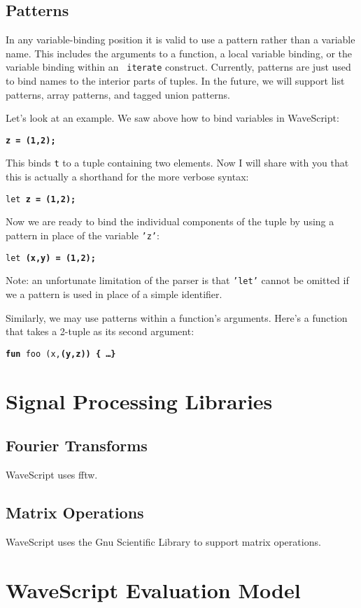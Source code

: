 \section{Patterns}

In any variable-binding position it is valid to use a pattern rather
than a variable name.  This includes the arguments to a function, a
local variable binding, or the variable binding within an {\tt
  iterate} construct.  Currently, patterns are just used to bind names
to the interior parts of tuples.  In the future, we will support list
patterns, array patterns, and tagged union patterns.  

Let's look at an example.
We saw above how to bind variables in WaveScript:
\begin{center}
{\tt \bf{z} = (1,2);}
\end{center}
This binds {\tt t} to a tuple containing two elements.  
Now I will share with you that this is actually a shorthand for the
more verbose syntax:
\begin{center}
{\tt let \bf{z} = (1,2);}
\end{center}
Now we are ready to bind the individual components of the tuple by using
a pattern in place of the variable {\tt 'z'}:
\begin{center}
{\tt let \bf{(x,y)} = (1,2);}
\end{center}
Note: an unfortunate limitation of the parser is that {\tt 'let'} cannot be
omitted if we a pattern is used in place of a simple identifier.

Similarly, we may use patterns within a function's arguments.  Here's
a function that takes a 2-tuple as its second argument:

\begin{center}
{\tt {\bf fun} foo (x,\bf{(y,z)}) \{ \dots \}}
\end{center}


\chapter{Signal Processing Libraries}

\section{Fourier Transforms}

WaveScript uses fftw.

\section{Matrix Operations}

WaveScript uses the Gnu Scientific Library to support matrix operations.

\chapter{WaveScript Evaluation Model}





